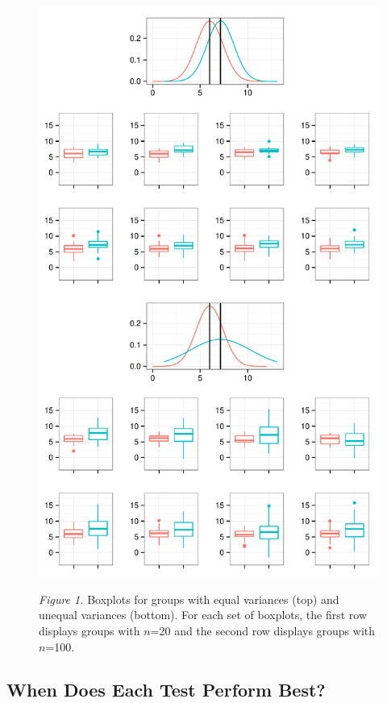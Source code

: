 \documentclass[man,a4paper,noextraspace,apacite]{apa6}
\begin{document}
   
\begin{figure}
\includegraphics{WelchManuscript-MASTER-varEqualBoxplots}

\textit{Figure 1.} Boxplots for groups with equal variances (top) and unequal 
variances (bottom). For each set of boxplots, the first row displays groups 
with $n$=20 and the second row displays groups with $n$=100.
\end{figure}

\subsection{When Does Each Test Perform Best?}
\end{document}
